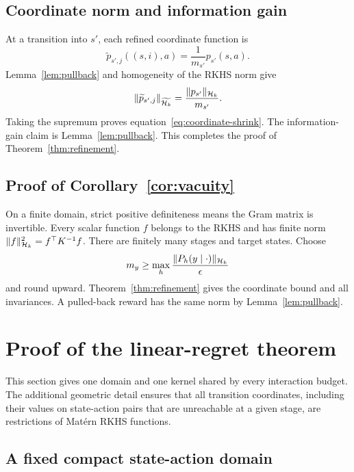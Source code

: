 \subsection{Coordinate norm and information gain}

At a transition into $s'$, each refined coordinate function is
\begin{equation}
 \widetilde p_{s',j}((s,i),a)
 =\frac{1}{m_{s'}}p_{s'}(s,a).
\end{equation}
Lemma~\ref{lem:pullback} and homogeneity of the RKHS norm give
\begin{equation}
 \|\widetilde p_{s',j}\|_{\widetilde{\mathcal H_k}}
 =\frac{\|p_{s'}\|_{\mathcal H_k}}{m_{s'}}.
\end{equation}
Taking the supremum proves equation~\eqref{eq:coordinate-shrink}.
The information-gain claim is Lemma~\ref{lem:pullback}. This completes the proof of
Theorem~\ref{thm:refinement}.

\subsection{Proof of Corollary~\ref{cor:vacuity}}

On a finite domain, strict positive definiteness means the Gram matrix is
invertible. Every scalar function $f$ belongs to the RKHS and has finite norm
$\|f\|_{\mathcal H_k}^2=f^\top K^{-1}f$. There are finitely many stages and target states.
Choose
\begin{equation}
 m_y\geq\max_h\frac{\|P_h(y\mid\cdot)\|_{\mathcal H_k}}{\epsilon}
\end{equation}
and round upward. Theorem~\ref{thm:refinement} gives the coordinate bound and all
invariances. A pulled-back reward has the same norm by
Lemma~\ref{lem:pullback}.

\section{Proof of the linear-regret theorem}
\label{app:lower}

This section gives one domain and one kernel shared by every interaction budget.
The additional geometric detail ensures that all transition coordinates, including
their values on state-action pairs that are unreachable at a given stage, are
restrictions of Mat\'ern RKHS functions.

\subsection{A fixed compact state-action domain}

